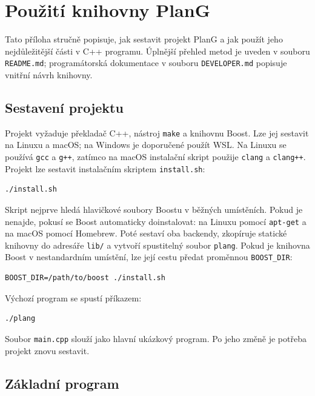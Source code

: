 \chapter{Použití knihovny PlanG}
\label{app:howto}

Tato příloha stručně popisuje, jak sestavit projekt PlanG a jak použít jeho
nejdůležitější části v C++ programu. Úplnější přehled metod je uveden v souboru
\texttt{README.md}; programátorská dokumentace v souboru \texttt{DEVELOPER.md}
popisuje vnitřní návrh knihovny.

\section{Sestavení projektu}

Projekt vyžaduje překladač C++, nástroj
\texttt{make} a knihovnu Boost. Lze jej sestavit na Linuxu a macOS; na Windows
je doporučené použít WSL. Na Linuxu se používá \texttt{gcc} a \texttt{g++},
zatímco na macOS instalační skript použije \texttt{clang} a \texttt{clang++}.
Projekt lze sestavit instalačním skriptem \texttt{install.sh}:

\begin{Verbatim}
./install.sh
\end{Verbatim}

Skript nejprve hledá hlavičkové soubory Boostu v běžných umístěních. Pokud je
nenajde, pokusí se Boost automaticky doinstalovat: na Linuxu pomocí
\texttt{apt-get} a na macOS pomocí Homebrew. Poté sestaví oba backendy,
zkopíruje statické knihovny do adresáře \texttt{lib/} a vytvoří spustitelný
soubor \texttt{plang}. Pokud je knihovna Boost v nestandardním umístění, lze
její cestu předat proměnnou \texttt{BOOST\_DIR}:

\begin{Verbatim}
BOOST_DIR=/path/to/boost ./install.sh
\end{Verbatim}

Výchozí program se spustí příkazem:

\begin{Verbatim}
./plang
\end{Verbatim}

Soubor \texttt{main.cpp} slouží jako hlavní ukázkový program. Po jeho změně je
potřeba projekt znovu sestavit.

\section{Základní program}

